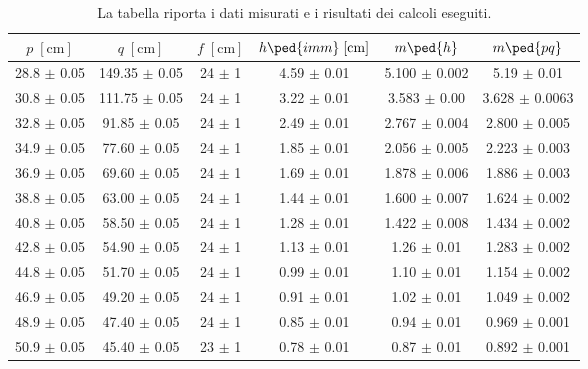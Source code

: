 
\begin{table}
    \centering
    \small
    \begin{tabular}{c c c c c c}
        \toprule
        $p \; [\si{\centi\metre}]$ & $q \; [\si{\centi\metre}]$ & $f \; [\si{\centi\metre}]$ &
        $h\ped{imm} \; [\si{\centi\metre}]$ & $m\ped{h}$ & $m\ped{pq}$ \\
        \midrule
        28.8 $\pm$ 0.05 & 149.35 $\pm$ 0.05 & 24 $\pm$ 1 & 4.59 $\pm$ 0.01 & 5.100 $\pm$ 0.002  & 5.19 $\pm$ 0.01 \\
		30.8 $\pm$ 0.05 & 111.75 $\pm$ 0.05 & 24 $\pm$ 1 & 3.22 $\pm$ 0.01 & 3.583 $\pm$ 0.00 & 3.628 $\pm$ 0.0063 \\
		32.8 $\pm$ 0.05 & 91.85 $\pm$ 0.05 & 24 $\pm$ 1 & 2.49 $\pm$ 0.01 & 2.767 $\pm$ 0.004& 2.800 $\pm$ 0.005  \\
		34.9 $\pm$ 0.05 & 77.60 $\pm$ 0.05 & 24 $\pm$ 1 & 1.85 $\pm$ 0.01 & 2.056 $\pm$ 0.005& 2.223 $\pm$ 0.003  \\
		36.9 $\pm$ 0.05 & 69.60 $\pm$ 0.05 & 24 $\pm$ 1 & 1.69 $\pm$ 0.01 & 1.878 $\pm$ 0.006& 1.886 $\pm$ 0.003  \\
		38.8 $\pm$ 0.05 & 63.00 $\pm$ 0.05 & 24 $\pm$ 1 & 1.44 $\pm$ 0.01 & 1.600 $\pm$ 0.007& 1.624 $\pm$ 0.002  \\
		40.8 $\pm$ 0.05 & 58.50 $\pm$ 0.05 & 24 $\pm$ 1 & 1.28 $\pm$ 0.01 & 1.422 $\pm$ 0.008& 1.434 $\pm$ 0.002  \\
		42.8 $\pm$ 0.05 & 54.90 $\pm$ 0.05 & 24 $\pm$ 1	& 1.13 $\pm$ 0.01 & 1.26 $\pm$ 0.01  & 1.283 $\pm$ 0.002  \\
		44.8 $\pm$ 0.05 & 51.70 $\pm$ 0.05 & 24 $\pm$ 1 & 0.99 $\pm$ 0.01 & 1.10 $\pm$ 0.01  & 1.154 $\pm$ 0.002  \\
		46.9 $\pm$ 0.05 & 49.20 $\pm$ 0.05 & 24 $\pm$ 1 & 0.91 $\pm$ 0.01 & 1.02 $\pm$ 0.01  & 1.049 $\pm$ 0.002  \\
		48.9 $\pm$ 0.05 & 47.40 $\pm$ 0.05 & 24 $\pm$ 1 & 0.85 $\pm$ 0.01 & 0.94 $\pm$ 0.01  & 0.969 $\pm$ 0.001  \\
		50.9 $\pm$ 0.05 & 45.40 $\pm$ 0.05 & 23 $\pm$ 1 & 0.78 $\pm$ 0.01 & 0.87 $\pm$ 0.01  & 0.892 $\pm$ 0.001  \\
        \bottomrule
    \end{tabular}
    \caption{La tabella riporta i dati misurati e i risultati dei calcoli eseguiti.}
    \label{tab:conv}
\end{table}
